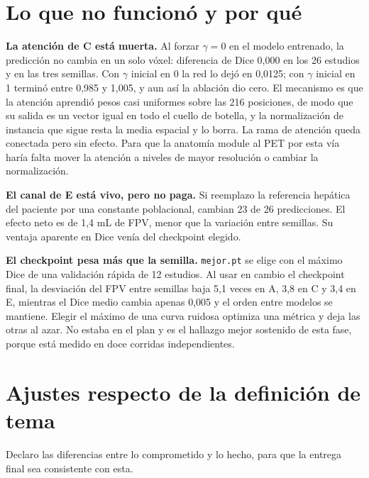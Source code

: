 \documentclass[11pt,a4paper]{article}
\begin{document}
\section{Lo que no funcionó y por qué}

\textbf{La atención de C está muerta.} Al forzar $\gamma=0$ en el modelo entrenado, la predicción no cambia en un solo vóxel: diferencia de Dice 0,000 en los 26 estudios y en las tres semillas. Con $\gamma$ inicial en 0 la red lo dejó en 0,0125; con $\gamma$ inicial en 1 terminó entre 0,985 y 1,005, y aun así la ablación dio cero. El mecanismo es que la atención aprendió pesos casi uniformes sobre las 216 posiciones, de modo que su salida es un vector igual en todo el cuello de botella, y la normalización de instancia que sigue resta la media espacial y lo borra. La rama de atención queda conectada pero sin efecto. Para que la anatomía module al PET por esta vía haría falta mover la atención a niveles de mayor resolución o cambiar la normalización.

\textbf{El canal de E está vivo, pero no paga.} Si reemplazo la referencia hepática del paciente por una constante poblacional, cambian 23 de 26 predicciones. El efecto neto es de 1,4 mL de FPV, menor que la variación entre semillas. Su ventaja aparente en Dice venía del checkpoint elegido.

\textbf{El checkpoint pesa más que la semilla.} \texttt{mejor.pt} se elige con el máximo Dice de una validación rápida de 12 estudios. Al usar en cambio el checkpoint final, la desviación del FPV entre semillas baja 5,1 veces en A, 3,8 en C y 3,4 en E, mientras el Dice medio cambia apenas 0,005 y el orden entre modelos se mantiene. Elegir el máximo de una curva ruidosa optimiza una métrica y deja las otras al azar. No estaba en el plan y es el hallazgo mejor sostenido de esta fase, porque está medido en doce corridas independientes.

\section{Ajustes respecto de la definición de tema}

Declaro las diferencias entre lo comprometido y lo hecho, para que la entrega final sea consistente con esta.
\end{document}

